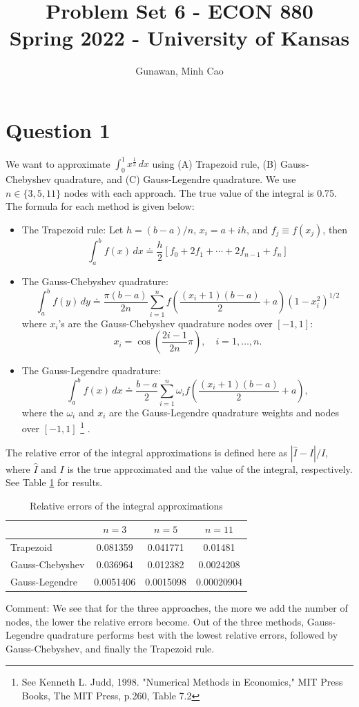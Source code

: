 \documentclass[11pt]{article}
\title{Problem Set 6 - ECON 880\\
	\small Spring 2022 - University of Kansas}
\author{Gunawan, Minh Cao}
\newcommand{\1}{\mathbbm{1}}
\newcounter{daggerfootnote}
\newcommand*{\daggerfootnote}[1]{%
	\setcounter{daggerfootnote}{\value{footnote}}%
	\renewcommand*{\thefootnote}{\fnsymbol{footnote}}%
	\footnote[2]{#1}%
	\setcounter{footnote}{\value{daggerfootnote}}%
	\renewcommand*{\thefootnote}{\arabic{footnote}}%
}
\begin{document}
\maketitle	
\section*{Question 1}
We want to approximate $\int_0^1x^{\frac{1}{3}}\,dx$ using (A) Trapezoid rule, (B) Gauss-Chebyshev quadrature, and (C) Gauss-Legendre quadrature. We use $n\in\{3,5,11\}$ nodes with each approach. The true value of the integral is 0.75. The formula for each method is given below:
\begin{itemize}
\item The Trapezoid rule: Let $h=(b-a)/n$, $x_i=a+ih$, and $f_j\equiv f(x_j)$, then
$$\int_{a}^{b} f(x) \,d x\doteq\frac{h}{2}\left[f_{0}+2 f_{1}+\cdots+2 f_{n-1}+f_{n}\right]$$
\item The Gauss-Chebyshev quadrature:
$$
\int_{a}^{b} f(y) \,dy \doteq \frac{\pi(b-a)}{2 n} \sum_{i=1}^{n} f\left(\frac{\left(x_{i}+1\right)(b-a)}{2}+a\right)\left(1-x_{i}^{2}\right)^{1 / 2}
$$
where $x_i$'s are the Gauss-Chebyshev quadrature nodes over $[-1,1]$:
$$
x_{i}=\cos \left(\frac{2 i-1}{2 n} \pi\right), \quad i=1, \ldots, n .
$$
\item The Gauss-Legendre quadrature:
$$
\int_{a}^{b} f(x) \,d x \doteq \frac{b-a}{2} \sum_{i=1}^{n} \omega_{i} f\left(\frac{\left(x_{i}+1\right)(b-a)}{2}+a\right),
$$
where the $\omega_i$ and $x_i$ are the Gauss-Legendre quadrature weights and nodes over $[-1,1]$\daggerfootnote{See Kenneth L. Judd, 1998. "Numerical Methods in Economics," MIT Press Books, The MIT Press, p.260, Table 7.2}.
\end{itemize}
The relative error of the integral approximations is defined here as $|\hat{I}-I|/I$, where $\hat{I}$ and $I$ is the true approximated and the value of the integral, respectively. See Table \ref{tab:1} for results.

\begin{table}[H]
	\centering
\begin{tabular}{ |l||c|c|c|  }
 \hline
               & $n=3$ &$n=5$&$n=11$\\
 \hline
    Trapezoid      & 0.081359     &0.041771 &   0.01481\\
     Gauss-Chebyshev   &     0.036964    & 0.012382     &0.0024208\\
 Gauss-Legendre   &0.0051406   & 0.0015098 & 0.00020904\\
  \hline
\end{tabular}
	\caption{Relative errors of the integral approximations}
\label{tab:1}
\end{table}
Comment: We see that for the three approaches, the more we add the number of nodes, the lower the relative errors become. Out of the three methods, Gauss-Legendre quadrature performs best with the lowest relative errors, followed by Gauss-Chebyshev, and finally the Trapezoid rule.
\end{document}
